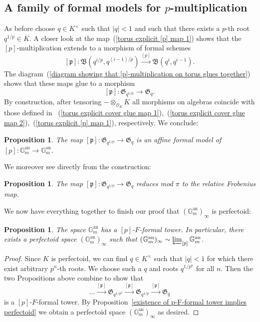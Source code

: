 \documentclass[10pt,oneside]{amsart}
\newtheorem{proposition}[theorem]{Proposition}
\theoremstyle{definition}
\begin{document}
	\subsection{A family of formal models for $p$-multiplication}
	As before choose $q\in K^\times$ such that $|q|<1$ and such that there exists a $p$-th root $q^{1/p} \in K$. A closer look at the map~(\ref{torus explicit [p] map 1}) shows that the $[p]$-multiplication extends to a morphism of formal schemes
	\[[\mathfrak p]: \mathfrak B(q^{i/p},q^{(i-1)/p})\xrightarrow{[p]} \mathfrak B(q^i,q^{i-1}).\]
	The diagram~(\ref{diagram showing that [p]-multiplication on torus glues together}) shows that these maps glue to a morphism
	\[[\mathfrak p]: \mathfrak G_{q^{1/p}}\rightarrow  \mathfrak G_q.\]
	By construction, after tensoring $-\otimes_{\mathcal O_K} K$ all morphisms on algebras coincide with those defined in ~(\ref{torus explicit cover glue map 1}),~(\ref{torus explicit cover glue map 2}),~(\ref{torus explicit [p] map 1}), respectively. We conclude:
	\begin{proposition}
		The map $[\mathfrak p]: \mathfrak G_{q^{1/p}}\rightarrow  \mathfrak G_q$ is an affine formal model of $[p]:\mathbb G_m^{\operatorname{an}}\rightarrow \mathbb G_m^{\operatorname{an}}$.
	\end{proposition}
	We moreover see directly from the construction:
	\begin{proposition}
		The map $[\mathfrak p]: \mathfrak G_{q^{1/p}}\rightarrow  \mathfrak G_q$ reduces mod $\pi$ to the relative Frobenius map.
	\end{proposition}
	We now have everything together to finish our proof that $(\mathbb G_m^{\operatorname{an}})_\infty$ is perfectoid:
	\begin{proposition}
		The space $\mathbb G_m^{\operatorname{an}}$ has a $[p]$-$F$-formal tower. In particular, there exists a perfectoid space $(\mathbb G_m^{\operatorname{an}})_\infty$ such that $(\mathbb G_m^{\operatorname{an}})_\infty \sim \varprojlim_{[p]} \mathbb G_m^{\operatorname{an}}$.
	\end{proposition}
	\begin{proof}
		Since $K$ is perfectoid, we can find $q\in K^\times$ such that $|q|<1$ for which there exist arbitrary $p^n$-th roots. We choose such a $q$ and roots $q^{1/p^n}$ for all $n$. Then the two Propositions above combine to show that 
		\[\dots \xrightarrow{[\mathfrak p]} \mathfrak G_{q^{1/p^2}}\xrightarrow{[\mathfrak p]} \mathfrak G_{q^{1/p}}\xrightarrow{[\mathfrak p]} \mathfrak G_q\]
		is a $[p]$-$F$-formal tower.
		By Proposition~\ref{existence of p-F-formal tower implies perfectoid} we obtain a perfectoid space $(\mathbb G_m^{\operatorname{an}})_\infty$ as desired.
	\end{proof}
	
\end{document}
